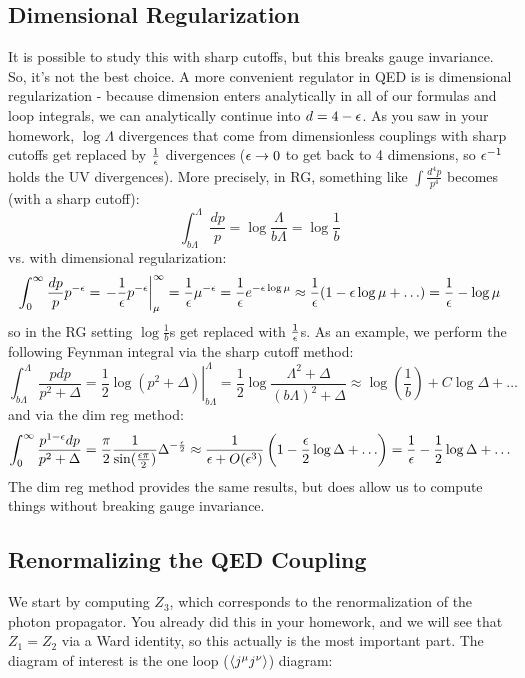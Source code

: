 \subsection{Dimensional Regularization}
It is possible to study this with sharp cutoffs, but this breaks gauge invariance. So, it's not the best choice. A more convenient regulator in QED is is dimensional regularization - because dimension enters analytically in all of our formulas and loop integrals, we can analytically continue into $d = 4 - \epsilon$. As you saw in your homework, $\log\Lambda$ divergences that come from dimensionless couplings with sharp cutoffs get replaced by $\frac{1}{\epsilon}$ divergences ($\epsilon \to 0$ to get back to 4 dimensions, so $\epsilon^{-1}$ holds the UV divergences). More precisely, in RG, something like $\int \frac{d^4p}{p^4}$ becomes (with a sharp cutoff):
\begin{equation}
    \int_{b\Lambda}^\Lambda \frac{dp}{p} = \log\frac{\Lambda}{b\Lambda} = \log\frac{1}{b}
\end{equation}
vs. with dimensional regularization:
\begin{equation}
    \int_0^\infty \frac{dp}{p}p^{-\epsilon} = \left.-\frac{1}{\epsilon}p^{-\epsilon}\right|_\mu^\infty = \frac{1}{\epsilon}\mu^{-\epsilon} = \frac{1}{\epsilon}e^{-\epsilon\log \mu} \approx \frac{1}{\epsilon}(1 - \epsilon\log\mu + \ldots) = \frac{1}{\epsilon} - \log \mu
\end{equation}
so in the RG setting $\log\frac{1}{b}$s get replaced with $\frac{1}{\epsilon}$s. As an example, we perform the following Feynman integral via the sharp cutoff method:
\begin{equation}
    \int_{b\Lambda}^\Lambda \frac{pdp}{p^2 + \Delta} = \left.\frac{1}{2}\log(p^2 + \Delta)\right|_{b\Lambda}^\Lambda = \frac{1}{2}\log\frac{\Lambda^2 + \Delta}{(b\Lambda)^2 + \Delta} \approx \log(\frac{1}{b}) + C\log\Delta + \ldots
\end{equation}
and via the dim reg method:
\begin{equation}
    \int_0^\infty \frac{p^{1-\epsilon}dp}{p^2 + \Delta} = \frac{\pi}{2}\frac{1}{\sin(\frac{\epsilon\pi}{2})}\Delta^{-\frac{\epsilon}{2}} \approx \frac{1}{\epsilon + O(\epsilon^3)}\left(1 - \frac{\epsilon}{2}\log\Delta + \ldots\right) = \frac{1}{\epsilon} - \frac{1}{2}\log \Delta + \ldots
\end{equation}
The dim reg method provides the same results, but does allow us to compute things without breaking gauge invariance.

\subsection{Renormalizing the QED Coupling}
We start by computing $Z_3$, which corresponds to the renormalization of the photon propagator. You already did this in your homework, and we will see that $Z_1 = Z_2$ via a Ward identity, so this actually is the most important part. The diagram of interest is the one loop ($\left< j^\mu j^\nu \right>$) diagram:


